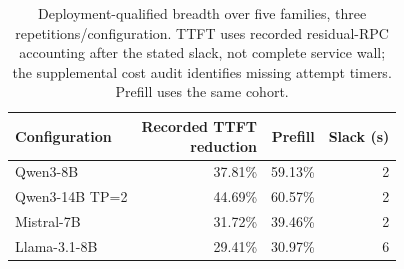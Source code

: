 \begin{table}[t]
\centering\small
\caption{Deployment-qualified breadth over five families, three repetitions/configuration. TTFT uses recorded residual-RPC accounting after the stated slack, not complete service wall; the supplemental cost audit identifies missing attempt timers. Prefill uses the same cohort.}
\label{tab:deployment-width}
\begin{tabular}{@{}lrrr@{}}
\toprule
Configuration & \shortstack{Recorded TTFT\\reduction} & Prefill & Slack (s)\\
\midrule
Qwen3-8B & 37.81\% & 59.13\% & 2\\
Qwen3-14B TP=2 & 44.69\% & 60.57\% & 2\\
Mistral-7B & 31.72\% & 39.46\% & 2\\
Llama-3.1-8B & 29.41\% & 30.97\% & 6\\
\bottomrule
\end{tabular}
\end{table}
